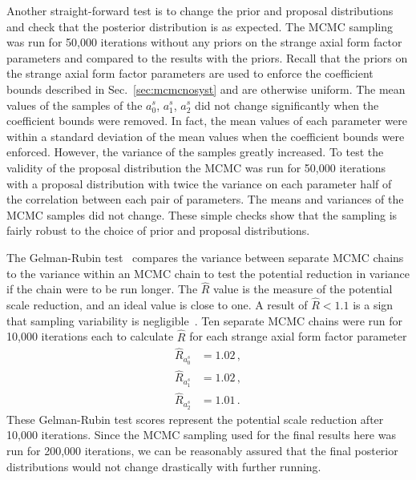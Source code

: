     Another straight-forward test is to change the prior and proposal
    distributions and check that the posterior distribution is as expected. The
    MCMC sampling was run for 50,000 iterations without any priors on the
    strange axial form factor parameters and compared to the results with the
    priors. Recall that the priors on the strange axial form factor parameters
    are used to enforce the coefficient bounds described in
    Sec.~\ref{sec:mcmcnosyst} and are otherwise uniform. The mean values of the
    samples of the $a_0^s$, $a_1^s$, $a_2^s$ did not change significantly when
    the coefficient bounds were removed. In fact, the mean values of each
    parameter were within a standard deviation of the mean values when the
    coefficient bounds were enforced. However, the variance of the samples
    greatly increased. To test the validity of the proposal distribution the
    MCMC was run for 50,000 iterations with a proposal distribution with twice
    the variance on each parameter half of the correlation between each pair of
    parameters. The means and variances of the MCMC samples did not change.
    These simple checks show that the sampling is fairly robust to the choice
    of prior and proposal distributions.

    The Gelman-Rubin test~\cite{Gelman:1992zz} compares the variance between
    separate MCMC chains to the variance within an MCMC chain to test the
    potential reduction in variance if the chain were to be run longer. The
    $\hat{R}$ value is the measure of the potential scale reduction, and an
    ideal value is close to one. A result of $\hat{R} < 1.1$ is a sign that
    sampling variability is negligible~\cite{Brooks:1997}. Ten separate MCMC
    chains were run for 10,000 iterations each to calculate $\hat{R}$ for each
    strange axial form factor parameter
    \begin{equation}
      \begin{aligned}
        \hat{R}_{a_0^s} &= 1.02 \,, \\
        \hat{R}_{a_1^s} &= 1.02 \,, \\
        \hat{R}_{a_2^s} &= 1.01 \,.
      \end{aligned}
    \end{equation}
    These Gelman-Rubin test scores represent the potential scale reduction
    after 10,000 iterations. Since the MCMC sampling used for the final results
    here was run for 200,000 iterations, we can be reasonably assured that the
    final posterior distributions would not change drastically with further
    running.

